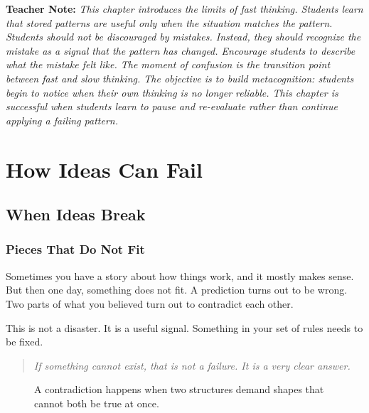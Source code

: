 \documentclass[12pt]{book}
\newenvironment{teachernote}
{\par\medskip\noindent\textbf{Teacher Note:} \itshape}
{\par\medskip}
\begin{document}
\begin{teachernote}
This chapter introduces the limits of fast thinking. Students learn that
stored patterns are useful only when the situation matches the pattern.
Students should not be discouraged by mistakes. Instead, they should
recognize the mistake as a signal that the pattern has changed. Encourage
students to describe what the mistake felt like. The moment of confusion
is the transition point between fast and slow thinking. The objective is
to build metacognition: students begin to notice when their own thinking
is no longer reliable. This chapter is successful when students learn to
pause and re-evaluate rather than continue applying a failing pattern.
\end{teachernote}

\part{How Ideas Can Fail}

\chapter{When Ideas Break}

\section{Pieces That Do Not Fit}

Sometimes you have a story about how things work, and it mostly makes sense.
But then one day, something does not fit. A prediction turns out to be wrong.
Two parts of what you believed turn out to contradict each other.

This is not a disaster. It is a useful signal. Something in your set of
rules needs to be fixed.

\begin{quote}\itshape
If something cannot exist, that is not a failure.
It is a very clear answer.
\end{quote}

\begin{figure}[h!]
\centering
{}
\caption{A contradiction happens when two structures demand shapes that cannot both be true at once.}
\end{figure}
\end{document}
